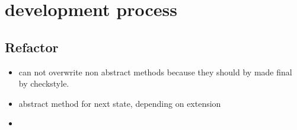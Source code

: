 \section{development process}
\subsection{Refactor}
\begin{itemize}
    \item can not overwrite non abstract methods because they should by made final by checkstyle.
    \item abstract method for next state, depending on extension
    \item 
\end{itemize}